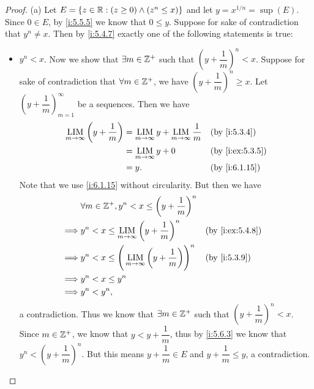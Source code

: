 \begin{proof}{(a)}
  Let \(E = \left\lbrace z \in \mathbb{R} : (z \geq 0) \land (z^n \leq x)\right\rbrace\) and let \(y = x^{1 / n} = \sup(E)\).
  Since \(0 \in E\), by \cref{i:5.5.5} we know that \(0 \leq y\).
  Suppose for sake of contradiction that \(y^n \neq x\).
  Then by \cref{i:5.4.7} exactly one of the following statements is true:
  \begin{itemize}
    \item \(y^n < x\).
          Now we show that \(\exists m \in \mathbb{Z}^+\) such that \((y + \dfrac{1}{m})^n < x\).
          Suppose for sake of contradiction that \(\forall m \in \mathbb{Z}^+\), we have \((y + \dfrac{1}{m})^n \geq x\).
          Let \((y + \dfrac{1}{m})_{m = 1}^\infty\) be a sequences.
          Then we have
          \begin{align*}
            \LIM_{m \to \infty} \bigg(y + \dfrac{1}{m}\bigg) & = \LIM_{m \to \infty} y + \LIM_{m \to \infty} \dfrac{1}{m} &  & \by{i:5.3.4}    \\
                                                             & = \LIM_{m \to \infty} y + 0                                &  & \by{i:ex:5.3.5} \\
                                                             & = y.                                                       &  & \by{i:6.1.15}
          \end{align*}
          Note that we use \cref{i:6.1.15} without circularity.
          But then we have
          \begin{align*}
                     & \forall m \in \Z^+, y^n < x \leq \bigg(y + \dfrac{1}{m}\bigg)^n                                  \\
            \implies & y^n < x \leq \LIM_{m \to \infty} \bigg(y + \dfrac{1}{m}\bigg)^n             &  & \by{i:ex:5.4.8} \\
            \implies & y^n < x \leq \Bigg(\LIM_{m \to \infty} \bigg(y + \dfrac{1}{m}\bigg)\Bigg)^n &  & \by{i:5.3.9}    \\
            \implies & y^n < x \leq y^n                                                                                 \\
            \implies & y^n < y^n,
          \end{align*}
          a contradiction.
          Thus we know that \(\exists m \in \mathbb{Z}^+\) such that \((y + \dfrac{1}{m})^n < x\).
          Since \(m \in \mathbb{Z}^+\), we know that \(y < y + \dfrac{1}{m}\), thus by \cref{i:5.6.3} we know that \(y^n < (y + \dfrac{1}{m})^n\).
          But this means \(y + \dfrac{1}{m} \in E\) and \(y + \dfrac{1}{m} \leq y\), a contradiction.

\end{itemize}
\end{proof}
